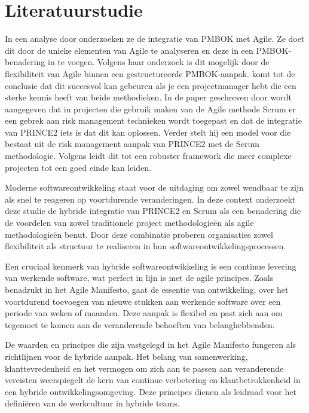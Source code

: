 \documentclass[dutch]{hogent-article}
\begin{document}
\section{Literatuurstudie}%
\label{sec:literatuurstudie}
In een analyse door \textcite{Schwalbe2012ManagingAP} onderzoeken ze de integratie van PMBOK met Agile.
Ze doet dit door de unieke elementen van Agile te analyseren en deze in een PMBOK-benadering in te voegen.
Volgens haar onderzoek is dit mogelijk door de flexibiliteit van Agile binnen een gestructureerde PMBOK-aanpak.
\textcite{Schwalbe2012ManagingAP} komt tot de conclusie dat dit succesvol kan gebeuren als je een projectmanager hebt die een sterke kennis heeft van beide methodieken.
\newline
In de paper geschreven door \textcite{Tomnek2015ProjectRM} wordt aangegeven dat in projecten die gebruik maken van de Agile methode Scrum er een gebrek
aan risk management technieken wordt toegepast en dat de integratie van PRINCE2 iets is dat dit kan oplossen.
Verder stelt hij een model voor die bestaat uit de risk management aanpak van PRINCE2 met de Scrum methodologie.
Volgens \textcite{Tomnek2015ProjectRM} leidt dit tot een robuster framework die meer complexe projecten tot een goed einde kan leiden.
\newline





Moderne softwareontwikkeling staat voor de uitdaging om zowel wendbaar te zijn als snel te reageren op voortdurende veranderingen. In deze context onderzoekt deze studie de hybride integratie van PRINCE2 en Scrum als een benadering die de voordelen van zowel traditionele project methodologieën als agile methodologieën benut. Door deze combinatie proberen organisaties zowel flexibiliteit als structuur te realiseren in hun softwareontwikkelingsprocessen.
\newline

Een cruciaal kenmerk van hybride softwareontwikkeling is een continue levering van werkende software, wat perfect in lijn is met de agile principes. Zoals \textcite{PoniszewskaMaranda2022} benadrukt in het Agile Manifesto, gaat de essentie van ontwikkeling, over het voortdurend toevoegen van nieuwe stukken aan werkende software over een periode van weken of maanden. Deze aanpak is flexibel en past zich aan om tegemoet te komen aan de veranderende behoeften van belanghebbenden.
\newline

De waarden en principes die zijn vastgelegd in het Agile Manifesto fungeren als richtlijnen voor de hybride aanpak. Het belang van samenwerking, klanttevredenheid en het vermogen om zich aan te passen aan veranderende vereisten \textcite{Fowler2020} weerspiegelt de kern van continue verbetering en klantbetrokkenheid in een hybride ontwikkelingsomgeving. Deze principes dienen als leidraad voor het definiëren van de werkcultuur in hybride teams.
\newline
\end{document}
